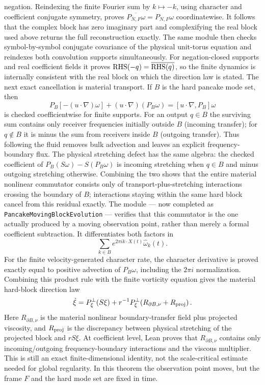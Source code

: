 \documentclass[11pt]{article}
\theoremstyle{definition}
\begin{document}
negation.  Reindexing the finite Fourier sum by $k\mapsto-k$, using character
and coefficient conjugate symmetry, proves
$\overline{P_{N,F}\omega}=P_{N,F}\omega$ coordinatewise.  It follows that the
complex block has zero imaginary part and complexifying the real block used
above returns the full reconstruction exactly.  The same module then checks
symbol-by-symbol conjugate covariance of the physical unit-torus equation and
reindexes both convolution supports simultaneously.  For negation-closed
supports and real coefficient fields it proves
${\rm RHS}(-q)=\overline{{\rm RHS}(q)}$, so the finite dynamics is internally
consistent with the real block on which the direction law is stated.
The next exact cancellation is material transport.  If $B$ is the hard
pancake mode set, then
\[
 P_B[-(u\cdot\nabla)\omega]+(u\cdot\nabla)(P_B\omega)
   =[u\cdot\nabla,P_B]\omega
\]
is checked coefficientwise for finite supports.  For an output $q\in B$ the
surviving sum contains only receiver frequencies initially outside $B$
(incoming transfer); for $q\notin B$ it is minus the sum from receivers inside
$B$ (outgoing transfer).  Thus following the fluid removes bulk advection and
leaves an explicit frequency-boundary flux.
The physical stretching defect has the same algebra: the checked coefficient
of $P_B(S\omega)-S(P_B\omega)$ is incoming stretching when $q\in B$ and minus
outgoing stretching otherwise.  Combining the two shows that the entire
material nonlinear commutator consists only of transport-plus-stretching
interactions crossing the boundary of $B$; interactions staying within the
same hard block cancel from this residual exactly.
The module --- now completed as
\texttt{PancakeMovingBlockEvolution} --- verifies that this commutator is the
one actually produced by a moving observation point, rather than merely a
formal coefficient subtraction.  It differentiates both factors in
\[
  \sum_{k\in B}e^{2\pi i k\cdot X(t)}\widehat\omega_k(t).
\]
For the finite velocity-generated character rate, the character derivative
is proved exactly equal to positive advection of $P_B\omega$, including the
$2\pi i$ normalization.  Combining this product rule with the finite
vorticity equation gives the material hard-block direction law
\[
 \dot\xi=P_\xi^\perp(S\xi)
   +r^{-1}P_\xi^\perp\!\left(
       R_{\partial B,\nu}+R_{\rm proj}
     \right).
\]
Here $R_{\partial B,\nu}$ is the material nonlinear boundary-transfer field
plus projected viscosity, and $R_{\rm proj}$ is the discrepancy between
physical stretching of the projected block and $rS\xi$.  At coefficient
level, Lean proves that $R_{\partial B,\nu}$ contains only incoming/outgoing
frequency-boundary interactions and the viscous multiplier.  This is still
an exact finite-dimensional identity, not the scale-critical estimate needed
for global regularity.  In this theorem the observation point moves, but
the frame $F$ and the hard mode set are fixed in time.
\end{document}
